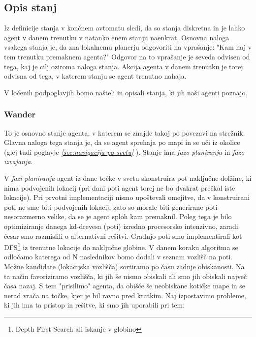 \documentclass[a4paper,10pt]{article}
\begin{document}
\subsection{Opis stanj}
Iz definicije stanja v končnem avtomatu sledi, da so stanja diskretna in je lahko agent v danem trenutku v natanko enem stanju naenkrat. Osnovna naloga vsakega stanja je, da zna lokalnemu planerju odgovoriti na vprašanje: "Kam naj v tem trenutku premaknem agenta?" Odgovor na to vprašanje je seveda odvisen od tega, kaj je cilj oziroma naloga stanja. Akcija agenta v danem trenutku je torej odvisna od tega, v katerem stanju se agent trenutno nahaja.

V ločenih podpoglavjih bomo našteli in opisali stanja, ki jih naši agenti poznajo.

\subsubsection{Wander}
To je osnovno stanje agenta, v katerem se znajde takoj po povezavi na strežnik. Glavna naloga tega stanja je, da se agent sprehaja po mapi in se uči iz okolice (glej tudi poglavje \textit{\ref{sec:navigacija-po-svetu} }). Stanje ima \textit{fazo planiranja} in \textit{fazo izvajanja}. 

V \textit{fazi planiranja} agent iz dane točke v svetu skonstruira pot naključne dolžine, ki nima podvojenih lokacij (pri dani poti agent torej ne bo dvakrat prečkal iste lokacije). Pri prvotni implementaciji nismo upoštevali omejitve, da v konstruirani poti ne sme biti podvojenih lokacij, zato so morale biti generirane poti nesorazmerno velike, da se je agent sploh kam premaknil. Poleg tega je bilo optimiziranje danega kd-drevesa (poti) izredno procesorsko intenzivno, zaradi česar smo razmislili o alternativni rešitvi. Gradnjo poti smo implementirali kot DFS\footnote{Depth First Search ali iskanje v globino} iz trenutne lokacije do naključne globine. V danem koraku algoritma se odločamo katerega od N naslednikov bomo dodali v seznam vozlišč na poti. Možne kandidate (lokacijska vozlišča) sortiramo po času zadnje obiskanosti. Na ta način favoriziramo vozlišča, ki jih še nismo obiskali ali smo jih obiskali največ časa nazaj. S tem "prisilimo" agenta, da obišče še neobiskane kotičke mape in se nerad vrača na točke, kjer je bil ravno pred kratkim. Naj izpostavimo probleme, ki jih ima ta pristop in rešitve, ki smo jih uporabili pri tem:
\end{document}
